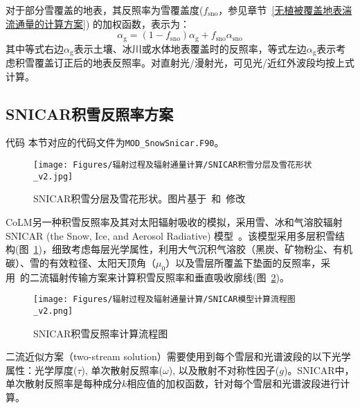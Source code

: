 对于部分雪覆盖的地表，其反照率为雪覆盖度($f_{\mathrm{sno}}$，参见章节~\ref{无植被覆盖地表湍流通量的计算方案}) 的加权函数，表示为：
\begin{equation}
  \alpha_{\mathrm{g}}=\left(1-f_{\mathrm{sno}}\right) \alpha_{\mathrm{g}} + f_{\mathrm{sno}} \alpha_{\mathrm{sno}}
\end{equation}
其中等式右边$\alpha_{\mathrm{g}}$表示土壤、冰川或水体地表覆盖时的反照率，等式左边$\alpha_{\mathrm{g}}$表示考虑积雪覆盖订正后的地表反照率。对直射光/漫射光，可见光/近红外波段均按上式计算。

\subsection{SNICAR积雪反照率方案}\label{SNICAR积雪反照率}
\begin{mymdframed}{代码}
  本节对应的代码文件为\texttt{MOD\_SnowSnicar.F90}。
\end{mymdframed}

{
  \begin{figure}[htbp]
    \centering
    \texttt{[image: Figures/辐射过程及辐射通量计算/SNICAR积雪分层及雪花形状\_v2.jpg]}
    \caption[SNICAR积雪分层及雪花形状]{SNICAR积雪分层及雪花形状。图片基于~\citet{he2017ImpactSnowGrain}和~\citet{whicker2022SNICARADv4PhysicallyBased}修改}
    \label{fig:SNICAR积雪分层及雪花形状}
  \end{figure}
}

CoLM另一种积雪反照率及其对太阳辐射吸收的模拟，采用雪、冰和气溶胶辐射SNICAR (the Snow, Ice, and Aerosol Radiative) 模型~\citep{flanner2021SNICARADv3CommunityTool}。该模型采用多层积雪结构(图~\ref{fig:SNICAR积雪分层及雪花形状})，细致考虑每层光学属性，利用大气沉积气溶胶（黑炭、矿物粉尘、有机碳）、雪的有效粒径、太阳天顶角（$\mu_{0}$）以及雪层所覆盖下垫面的反照率，采用~\citet{toon1989RapidCalculationRadiative}的二流辐射传输方案来计算积雪反照率和垂直吸收廓线(图~\ref{fig:SNICAR模型流程图})。

{
  \begin{figure}[htbp]
    \centering
    \texttt{[image: Figures/辐射过程及辐射通量计算/SNICAR模型计算流程图\_v2.png]}
    \caption[SNICAR积雪反照率计算流程图]{SNICAR积雪反照率计算流程图\citep{he2020SnowAlbedoRadiative}}
    \label{fig:SNICAR模型流程图}
  \end{figure}
}

二流近似方案（two-stream
solution）需要使用到每个雪层和光谱波段的以下光学属性：光学厚度($\tau$),
单次散射反照率($\omega$),
以及散射不对称性因子($g$)。SNICAR中，单次散射反照率是每种成分$k$相应值的加权函数，针对每个雪层和光谱波段进行计算。

